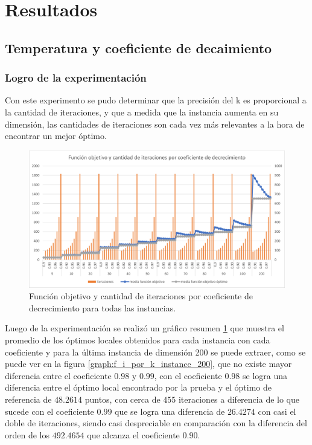 \section{Resultados}

\subsection{Temperatura y coeficiente de decaimiento}

\subsubsection{Logro de la experimentación}
Con este experimento se pudo determinar que la precisión del k es proporcional a la cantidad de iteraciones, y que a medida que la instancia aumenta en su dimensión, las cantidades de iteraciones son cada vez más relevantes a la hora de encontrar un mejor óptimo.

\begin{figure}[!ht]
    \centering
    \includegraphics[width=\textwidth]{images/testing/funcion_objetivo_vs_k.png}
    \caption{Función objetivo y cantidad de iteraciones por coeficiente de decrecimiento para todas las instancias.}
    \label{graph:k_all_instances}
\end{figure}

Luego de la experimentación se realizó un gráfico resumen \ref{graph:k_all_instances} que muestra el promedio de los óptimos locales obtenidos para cada instancia con cada coeficiente y para la última instancia de dimensión 200 se puede extraer, como se puede ver en la figura \ref{graph:f_i_por_k_instance_200}, que no existe mayor diferencia entre el coeficiente $0.98$ y $0.99$, con el coeficiente $0.98$ se logra una diferencia entre el óptimo local encontrado por la prueba y el óptimo de referencia de $48.2614$ puntos, con cerca de $455$ iteraciones a diferencia de lo que sucede con el coeficiente $0.99$ que se logra una diferencia de $26.4274$ con casi el doble de iteraciones, siendo casi despreciable en comparación con la diferencia del orden de los $492.4654$ que alcanza el coeficiente $0.90$.


